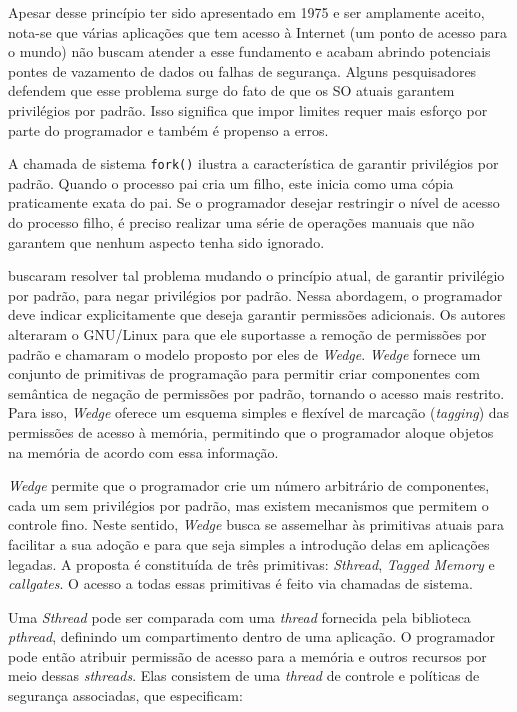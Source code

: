 Apesar desse princípio ter sido apresentado em 1975 e ser amplamente aceito,
nota-se que várias aplicações que tem acesso à Internet (um ponto de acesso
para o mundo) não buscam atender a esse fundamento e acabam abrindo
potenciais pontes de vazamento de dados ou falhas de segurança. Alguns
pesquisadores defendem que esse problema surge do fato de que os SO atuais
garantem privilégios por padrão. Isso significa que impor limites requer mais
esforço por parte do programador e também é propenso a erros.

A chamada de sistema \texttt{fork()} ilustra a característica de garantir
privilégios por padrão. Quando o processo pai cria um filho, este inicia como uma
cópia praticamente exata do pai. Se o programador desejar restringir o nível de
acesso do processo filho, é preciso realizar uma série de operações manuais que
não garantem que nenhum aspecto tenha sido ignorado.

\citet{wedge} buscaram resolver tal problema mudando o princípio atual, de
garantir privilégio por padrão, para negar privilégios por padrão. Nessa
abordagem, o programador deve indicar explicitamente que deseja garantir
permissões adicionais. Os autores alteraram o GNU/Linux para que ele
suportasse a remoção de permissões por padrão e chamaram o modelo proposto por
eles de \emph{Wedge}. \emph{Wedge} fornece um conjunto de primitivas de
programação para permitir criar componentes com semântica de negação de permissões
por padrão, tornando o acesso mais restrito. Para isso, \emph{Wedge} oferece
um esquema simples e flexível de marcação (\emph{tagging}) das permissões de
acesso à memória, permitindo que o programador aloque objetos na memória de
acordo com essa informação.

\emph{Wedge} permite que o programador crie um número arbitrário de
componentes, cada um sem privilégios por padrão, mas existem mecanismos que
permitem o controle fino. Neste sentido, \emph{Wedge} busca se assemelhar às
primitivas atuais para facilitar a sua adoção e para que seja simples a
introdução delas em aplicações legadas. A proposta é constituída de três
primitivas: \emph{Sthread}, \emph{Tagged Memory} e \emph{callgates}. O
acesso a todas essas primitivas é feito via chamadas de sistema.

Uma \emph{Sthread} pode ser comparada com uma \emph{thread} fornecida pela biblioteca
\textit{pthread}, definindo um compartimento dentro de uma
aplicação. O programador pode então atribuir permissão de acesso para a memória
e outros recursos por meio dessas \emph{sthreads}. Elas consistem de uma
\emph{thread} de controle e políticas de segurança associadas, que especificam:

